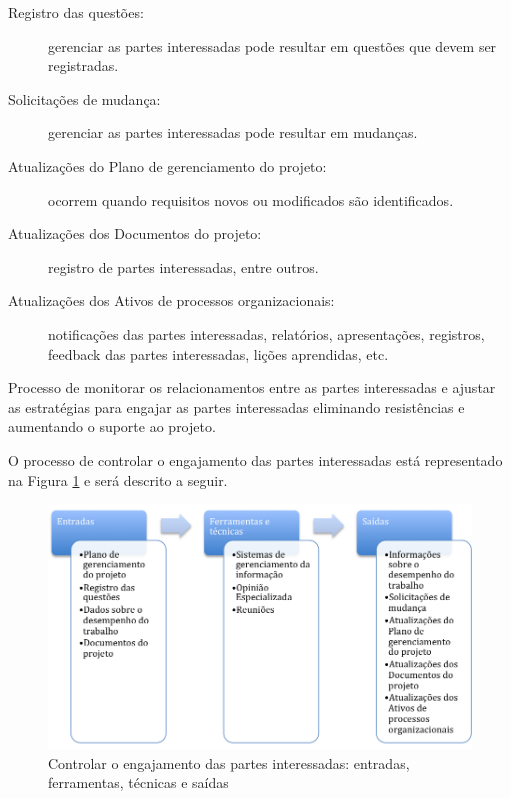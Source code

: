 \begin{description}
	
	\item[Registro das questões:] gerenciar as partes interessadas pode resultar em questões que devem ser registradas.
	
	\item[Solicitações de mudança:] gerenciar as partes interessadas pode resultar em mudanças.
	
	\item[Atualizações do Plano de gerenciamento do projeto:] ocorrem quando requisitos novos ou modificados são identificados.
	
	\item[Atualizações dos Documentos do projeto:] registro de partes interessadas, entre outros.
	
	\item[Atualizações dos Ativos de processos organizacionais:] notificações das partes interessadas, relatórios, apresentações, registros, feedback das partes interessadas, lições aprendidas, etc.
	
\end{description}


Processo de monitorar os relacionamentos entre as partes interessadas e ajustar as estratégias para engajar as partes interessadas eliminando resistências e aumentando o suporte ao projeto.

O processo de controlar o engajamento das partes interessadas está representado na Figura \ref{fig:rh:engaja:cont:efts} e será descrito a seguir.

\begin{figure}[!h]
	\centering
	\includegraphics[scale=0.5]{Figuras/stakeholders_efts_cont_engaja.png}
	\caption{Controlar o engajamento das partes interessadas: entradas, ferramentas, técnicas e saídas}
	\label{fig:rh:engaja:cont:efts}
\end{figure}

